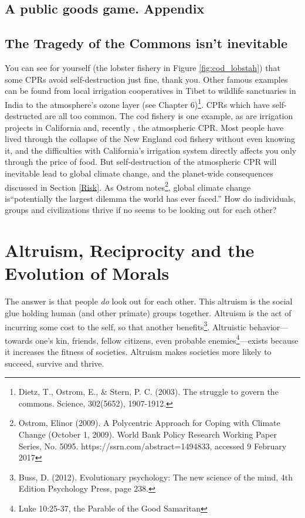 \subsection{A public goods game. Appendix}
\subsection{The Tragedy of the Commons isn't inevitable}
You can see for yourself (the lobster fishery in Figure \ref{fig:cod_lobstah}) that some CPRs avoid self-destruction just fine, thank you. Other famous examples can be found from local irrigation cooperatives in Tibet to wildlife sanctuaries in India to the atmosphere's ozone layer (see Chapter 6)\footnote{Dietz, T., Ostrom, E., \& Stern, P. C. (2003). The struggle to govern the commons. Science, 302(5652), 1907-1912.}. CPRs which have self-destructed are all too common. The cod fishery is one example, as are irrigation projects in California and, recently , the atmospheric CPR. Most people have lived through the collapse of the New England cod fishery without even knowing it, and the difficulties with California's irrigation system directly affects you only through the price of food. But self-destruction of the atmospheric CPR will inevitable lead to global climate change, and the planet-wide consequences discussed in Section \ref{Risk}. As Ostrom notes\footnote{Ostrom, Elinor (2009). A Polycentric Approach for Coping with Climate Change (October 1, 2009). World Bank Policy Research Working Paper Series, No. 5095. https://ssrn.com/abstract=1494833, accessed 9 February 2017}, global climate change is``potentially the largest dilemma the world has ever faced.'' How do individuals, groups and civilizations thrive if no seems to be looking out for each other?\\ 

\section{Altruism, Reciprocity and the Evolution of Morals}
The answer is that people \emph{do} look out for each other. This altruism is the social glue holding human (and other primate) groups together. Altruism is the act of incurring some cost to the self, so that another benefits\footnote{Buss, D. (2012). Evolutionary psychology: The new science of the mind, 4th Edition Psychology Press, page 238.}. Altruistic behavior---towards one's kin, friends, fellow citizens, even probable enemies\footnote{Luke 10:25-37, the Parable of the Good Samaritan}---exists because it increases the fitness of societies. Altruism makes societies more likely to succeed, survive and thrive. 

